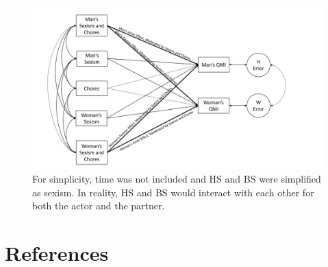 \documentclass[
  man]{apa6}
\begin{document}
\newpage

\begin{figure}
\centering
\includegraphics{APIM.png}
\caption{For simplicity, time was not included and HS and BS were simplified as sexism. In reality, HS and BS would interact with each other for both the actor and the partner.}
\end{figure}

\newpage

\hypertarget{references}{%
\section{References}\label{references}}

\begingroup
\setlength{\parindent}{-0.5in}
\setlength{\leftskip}{0.5in}
\end{document}
